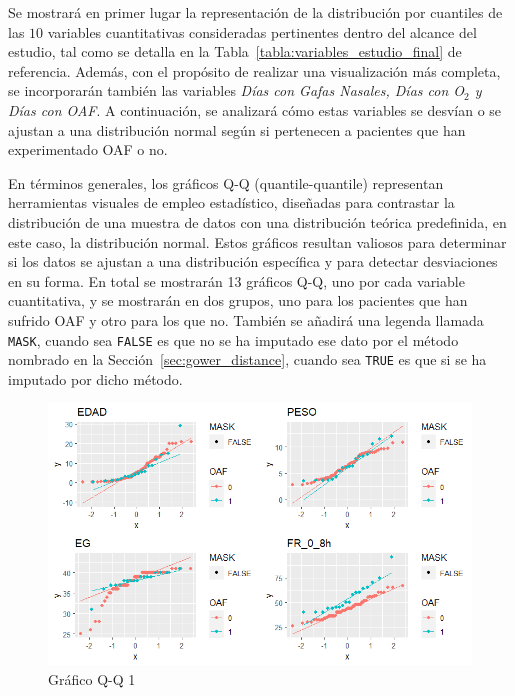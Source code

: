 Se mostrará en primer lugar la representación de la distribución por cuantiles de las $10$ variables cuantitativas consideradas pertinentes dentro del alcance del estudio, tal como se detalla en la Tabla~\ref{tabla:variables_estudio_final} de referencia. Además, con el propósito de realizar una visualización más completa, se incorporarán también las variables \textit{Días con Gafas Nasales, Días con O$_2$ y Días con OAF}. A continuación, se analizará cómo estas variables se desvían o se ajustan a una distribución normal según si pertenecen a pacientes que han experimentado OAF o no.

En términos generales, los gráficos Q-Q (quantile-quantile) representan herramientas visuales de empleo estadístico, diseñadas para contrastar la distribución de una muestra de datos con una distribución teórica predefinida, en este caso, la distribución normal. Estos gráficos resultan valiosos para determinar si los datos se ajustan a una distribución específica y para detectar desviaciones en su forma. En total se mostrarán 13 gráficos Q-Q, uno por cada variable cuantitativa, y se mostrarán en dos grupos, uno para los pacientes que han sufrido OAF y otro para los que no. También se añadirá una legenda llamada \texttt{MASK}, cuando sea \texttt{FALSE} es que no se ha imputado ese dato por el método nombrado en la Sección~\ref{sec:gower_distance}, cuando sea \texttt{TRUE} es que si se ha imputado por dicho método.

\begin{figure}[H]
    \centering
    \includegraphics[scale = 1]{./img/qq1.png}
    \caption{Gráfico Q-Q 1}\label{fig:qq1}
\end{figure}

